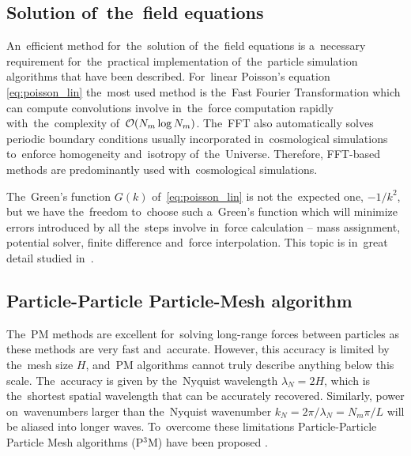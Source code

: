 \subsection{Solution of~the~field equations}
An~efficient method for~the~solution of~the~field equations is a~necessary requirement for~the~practical implementation of~the~particle simulation algorithms that have been described. For~linear Poisson’s equation \eqref{eq:poisson_lin} the~most used method is the~Fast Fourier Transformation which can compute convolutions involve in~the~force computation rapidly with~the~complexity of~$\mathcal{O}(N_m\log N_m)$. The~FFT also automatically solves periodic boundary conditions usually incorporated in~cosmological simulations to~enforce homogeneity and~isotropy of~the~Universe. Therefore, FFT-based methods are predominantly used with~cosmological simulations.

The~Green's function $G(k)$ of~\eqref{eq:poisson_lin} is not the~expected one, $-1/k^2$, but we have the~freedom to~choose such a~Green's function which will minimize errors introduced by all the~steps involve in~force calculation -- mass assignment, potential solver, finite difference and~force interpolation. This topic is in~great detail studied in~\textcite{Hockney:1988:CSU:62815}.
\subsection{Particle-Particle Particle-Mesh algorithm}
The~PM methods are excellent for~solving long-range forces between particles as these methods are very fast and~accurate. However, this accuracy is limited by the~mesh size $H$, and~PM algorithms cannot truly describe anything below this scale. The~accuracy is given by the~Nyquist wavelength $\lambda_N=2H$, which is the~shortest spatial wavelength that can be accurately recovered. Similarly, power on~wavenumbers larger than the~Nyquist wavenumber $k_N=2\pi/\lambda_N=N_m\pi/L$ will be aliased into longer waves. To~overcome these limitations Particle-Particle Particle Mesh algorithms (P$^3$M) have been proposed \textcite{hockney_10000_1973}.

